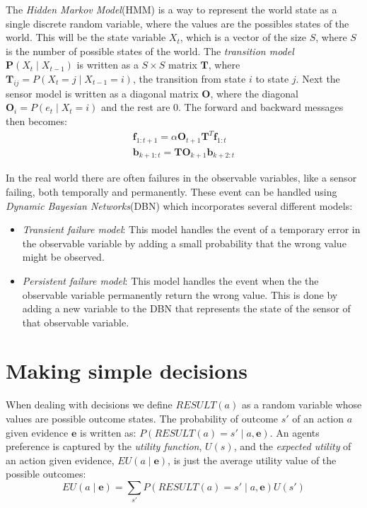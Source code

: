 \documentclass[11pt, letterpaper]{report}
\numberwithin{equation}{section}
\begin{document}
The \emph{Hidden Markov Model}(HMM) is a way to represent the world state as a
single discrete random variable, where the values are the possibles states of
the world. This will be the state variable $X_t$, which is a vector of the size
$S$, where $S$ is the number of possible states of the world. The
\emph{transition model} $\boldsymbol{P}(X_t \mid X_{t-1})$ is written as a
$S \times S$ matrix $\boldsymbol{T}$, where $\boldsymbol{T}_{ij} = P(X_t = j \mid
X_{t-1} = i)$, the transition from state $i$ to state $j$. Next the sensor model
is written as a diagonal matrix $\boldsymbol{O}$, where the diagonal $\boldsymbol{O}_{i} =
P(e_t\mid X_t = i)$ and the rest are 0. The forward and backward messages then
becomes:
\begin{gather}
  \label{eq:hmm}
  \boldsymbol{f}_{1:t+1} = \alpha \boldsymbol{O}_{t+1}\boldsymbol{T}^T\boldsymbol{f}_{1:t} \\
  \boldsymbol{b}_{k+1:t} = \boldsymbol{T}\boldsymbol{O}_{k+1}\boldsymbol{b}_{k+2:t}
\end{gather}

In the real world there are often failures in the observable variables, like a
sensor failing, both temporally and permanently. These event can be handled
using \emph{Dynamic Bayesian Networks}(DBN) which incorporates several different models:
\begin{itemize}
\item \emph{Transient failure model}: This model handles the event of a
  temporary error in the observable variable by adding a small probability that
  the wrong value might be observed.
\item \emph{Persistent failure model}: This model handles the event when the
  the observable variable permanently return the wrong value. This is done by
  adding a new variable to the DBN that represents the state of the sensor of
  that observable variable.
\end{itemize}

\section{Making simple decisions}
When dealing with decisions we define $RESULT(a)$ as a random variable whose
values are possible outcome states. The probability of outcome $s'$ of an action
$a$ given evidence $\boldsymbol{e}$ is written as: $P(RESULT(a)=s' \mid
a,\boldsymbol{e})$. An agents preference is captured by the \emph{utility
  function}, $U(s)$, and the \emph{expected utility} of an action given
evidence, $EU(a \mid \boldsymbol{e})$, is just the average utility value of the
possible outcomes:
\begin{equation}
  \label{eq:expectedutil}
  EU(a \mid \boldsymbol{e}) = \sum_{s'} P(RESULT(a)=s' \mid a,\boldsymbol{e})U(s')
\end{equation}
\end{document}
